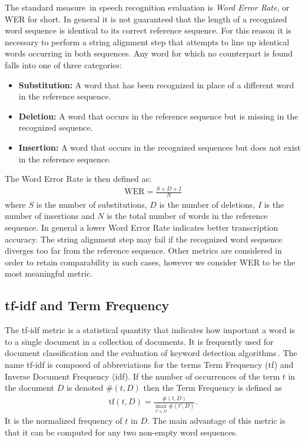 \documentclass[11pt]{article}
\begin{document}
The standard measure\,\cite{WER1, WER2, WER3} in speech recognition evaluation is \emph{Word Error Rate}, or WER for short.
In general it is not guaranteed that the length of a recognized word sequence is identical to its correct reference sequence.
For this reason it is necessary to perform a string alignment step that attempts to line up identical words occurring in both sequences.
Any word for which no counterpart is found falls into one of three categories:
\begin{itemize}
	\itemsep 0em
	\item \textbf{Substitution:} A word that has been recognized in place of a different word in the reference sequence.
	\item \textbf{Deletion:} A word that occurs in the reference sequence but is missing in the recognized sequence.
	\item \textbf{Insertion:} A word that occurs in the recognized sequences but does not exist in the reference sequence.
\end{itemize}
The Word Error Rate is then defined as:
\begin{align}
	\mathrm{WER} = \frac{S + D + I}{N}
\end{align}
where $S$ is the number of substitutions, $D$ is the number of deletions, $I$ is the number of insertions and $N$ is the total number of words in the reference sequence.
In general a lower Word Error Rate indicates better transcription accuracy.
The string alignment step may fail if the recognized word sequence diverges too far from the reference sequence.
Other metrics are considered in order to retain comparability in such cases, however we consider WER to be the most meaningful metric.

\subsection*{tf-idf and Term Frequency}

The tf-idf metric is a statistical quantity that indicates how important a word is to a single document in a collection of documents.
It is frequently used for document classification and the evaluation of keyword detection algorithms\,\cite{TFIDF1, TFIDF2}.
The name tf-idf is composed of abbreviations for the terms Term Frequency (tf) and Inverse Document Frequency (idf). 
If the number of occurrences of the term $t$ in the document $D$ is denoted $\#(t, D)$ then the Term Frequency is defined as
\begin{align}
	\mathrm{tf}(t, D) = \frac{\#(t, D)}{\max_{t' \in D} \#(t', D)}.
\end{align}
It is the normalized frequency of $t$ in $D$.
The main advantage of this metric is that it can be computed for any two non-empty word sequences. \\
\end{document}
